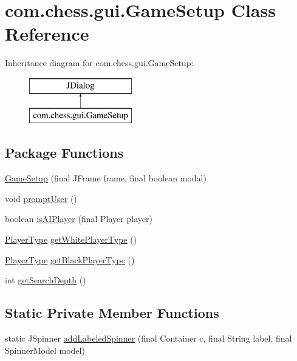 \hypertarget{classcom_1_1chess_1_1gui_1_1_game_setup}{}\section{com.\+chess.\+gui.\+Game\+Setup Class Reference}
\label{classcom_1_1chess_1_1gui_1_1_game_setup}
Inheritance diagram for com.\+chess.\+gui.\+Game\+Setup\+:\begin{figure}[H]
\begin{center}
\leavevmode
\includegraphics[height=2.000000cm]{classcom_1_1chess_1_1gui_1_1_game_setup}
\end{center}
\end{figure}
\subsection*{Package Functions}
\begin{DoxyCompactItemize}
\item 
\mbox{\hyperlink{classcom_1_1chess_1_1gui_1_1_game_setup_adc584784b97f7f921bbed681891ab10e}{Game\+Setup}} (final J\+Frame frame, final boolean modal)
\item 
void \mbox{\hyperlink{classcom_1_1chess_1_1gui_1_1_game_setup_ac067aebf720dbbcd55a0ae616f663954}{prompt\+User}} ()
\item 
boolean \mbox{\hyperlink{classcom_1_1chess_1_1gui_1_1_game_setup_ae70ab4a543dfc9f39ae6b538efa1a49f}{is\+A\+I\+Player}} (final Player player)
\item 
\mbox{\hyperlink{enumcom_1_1chess_1_1gui_1_1_table_1_1_player_type}{Player\+Type}} \mbox{\hyperlink{classcom_1_1chess_1_1gui_1_1_game_setup_a06a4ac277a0aeaa91b5449eddb47f344}{get\+White\+Player\+Type}} ()
\item 
\mbox{\hyperlink{enumcom_1_1chess_1_1gui_1_1_table_1_1_player_type}{Player\+Type}} \mbox{\hyperlink{classcom_1_1chess_1_1gui_1_1_game_setup_a7d963720170a0c3d64249e9b7a7f5ad3}{get\+Black\+Player\+Type}} ()
\item 
int \mbox{\hyperlink{classcom_1_1chess_1_1gui_1_1_game_setup_a9cc1e08d625b42ce013e121c11877d38}{get\+Search\+Depth}} ()
\end{DoxyCompactItemize}
\subsection*{Static Private Member Functions}
\begin{DoxyCompactItemize}
\item 
static J\+Spinner \mbox{\hyperlink{classcom_1_1chess_1_1gui_1_1_game_setup_ac413465ce7bf4ae59f43dd3027e52acb}{add\+Labeled\+Spinner}} (final Container c, final String label, final Spinner\+Model model)
\end{DoxyCompactItemize}

